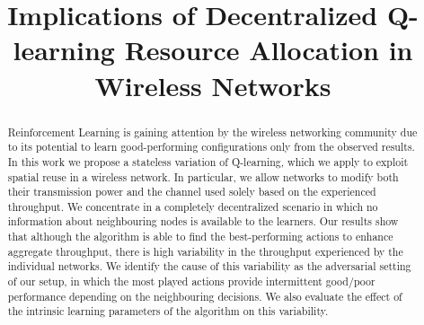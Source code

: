 \documentclass[conference]{IEEEtran}
\begin{document}
	
	\title{Implications of Decentralized Q-learning Resource Allocation in Wireless Networks}
	
	\author{
		\and
		
		\and
	}
	
	\maketitle
	
	\begin{abstract}
		Reinforcement Learning is gaining attention by the wireless networking community due to its potential to learn good-performing configurations only from the observed results. In this work we propose a stateless variation of Q-learning, which we apply to exploit spatial reuse in a wireless network. In particular, we allow networks to modify both their transmission power and the channel used solely based on the experienced throughput. We concentrate in a completely decentralized scenario in which no information about neighbouring nodes is available to the learners. Our results show that although the algorithm is able to find the best-performing actions to enhance aggregate throughput, there is high variability in the throughput experienced by the individual networks.
		We identify the cause of this variability as the adversarial setting of our setup, in which the most played actions provide intermittent good/poor performance depending on the neighbouring decisions. We also evaluate the effect of the intrinsic learning parameters of the algorithm on this variability.
		
	\end{abstract}
	
	\IEEEpeerreviewmaketitle
	
\end{document}
